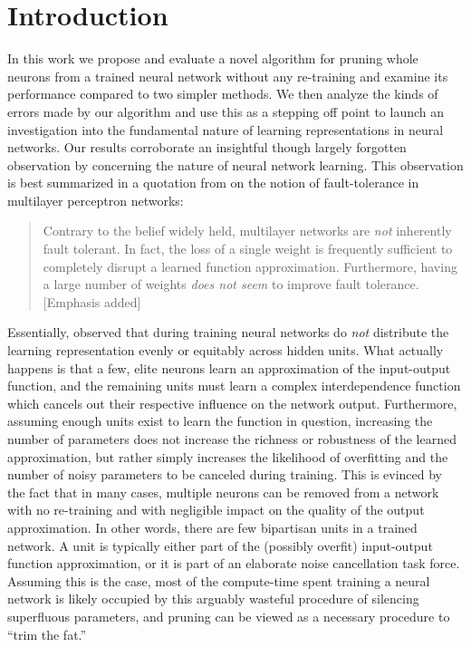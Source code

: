 \section{Introduction}\label{sec1}

In this work we propose and evaluate a novel algorithm for pruning whole neurons from a trained neural network without any re-training and examine its performance compared to two simpler methods. We then analyze the kinds of errors made by our algorithm and use this as a stepping off point to launch an investigation into the fundamental nature of learning representations in neural networks. Our results corroborate an insightful though largely forgotten observation by \cite{mozer1989skeletonization} concerning the nature of neural network learning. This observation is best summarized in a quotation from \cite{segee1991fault} on the notion of fault-tolerance in multilayer perceptron networks:

\begin{quotation}
Contrary to the belief widely held, multilayer networks are \textit{not} inherently fault tolerant. In fact, the loss of a single weight is frequently sufficient to completely disrupt a learned function approximation. Furthermore, having a large number of weights \textit{does not seem} to improve fault tolerance. [Emphasis added]
\end{quotation}

Essentially, \cite{mozer1989using} observed that during training neural networks do \textit{not} distribute the learning representation evenly or equitably across hidden units. What actually happens is that a few, elite neurons learn an approximation of the input-output function, and the remaining units must learn a complex interdependence function which cancels out their respective influence on the network output. Furthermore, assuming enough units exist to learn the function in question, increasing the number of parameters does not increase the richness or robustness of the learned approximation, but rather simply increases the likelihood of overfitting and the number of noisy parameters to be canceled during training. This is evinced by the fact that in many cases, multiple neurons can be removed from a network with no re-training and with negligible impact on the quality of the output approximation. In other words, there are few bipartisan units in a trained network. A unit is typically either part of the (possibly overfit) input-output function approximation, or it is part of an elaborate noise cancellation task force. Assuming this is the case, most of the compute-time spent training a neural network is likely occupied by this arguably wasteful procedure of silencing superfluous parameters, and pruning can be viewed as a necessary procedure to ``trim the fat.''

